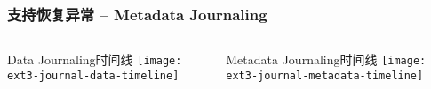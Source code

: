 \begin{frame}[fragile]
	\frametitle{支持恢复异常 -- Metadata Journaling}
	\begin{columns}[t]
		\begin{column}{.5\textwidth}
			\centering
			Data Journaling时间线
			\texttt{[image: ext3-journal-data-timeline]}


		\end{column}
		\begin{column}{.5\textwidth}	
			\centering
			Metadata Journaling时间线		
			\texttt{[image: ext3-journal-metadata-timeline]}
		\end{column}
	\end{columns}
	
\end{frame}

